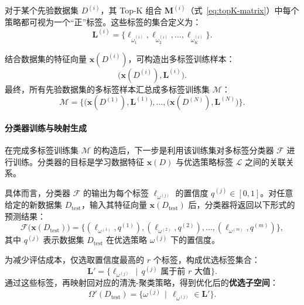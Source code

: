 \documentclass[8pt]{article} %
\numberwithin{equation}{section}
\begin{document}
对于某个先验数据集 $D^{(i)}$，其 Top-K 组合 $\mathbf{M}^{(i)}$（式~\eqref{eq:topK-matrix}）中每个策略都可视为一个“正”标签。这些标签的集合定义为：
\begin{equation}\label{eq:label-space-for-D}
\mathbf{L}^{(i)}
= \{\ell_{\omega_1^{(i)}}, \ell_{\omega_2^{(i)}}, \ldots, \ell_{\omega_K^{(i)}}\}.
\end{equation}

结合数据集的特征向量 $\mathbf{x}(D^{(i)})$，可构造出多标签训练样本：
\[
\bigl(\mathbf{x}(D^{(i)}), \mathbf{L}^{(i)}\bigr).
\]
最终，所有先验数据集的多标签样本汇总成多标签训练集 $\mathcal{M}$：
\begin{equation}\label{eq:training-set}
\mathcal{M}
= \bigl\{\bigl(\mathbf{x}(D^{(1)}), \mathbf{L}^{(1)}\bigr), \ldots, \bigl(\mathbf{x}(D^{(N)}), \mathbf{L}^{(N)}\bigr)\bigr\}.
\end{equation}

\paragraph{分类器训练与映射生成}  
在完成多标签训练集 $\mathcal{M}$ 的构造后，下一步是利用该训练集对多标签分类器 $\mathcal{F}$ 进行训练。分类器的目标是学习数据特征 $\mathbf{x}(D)$ 与优选策略标签 $\mathcal{L}$ 之间的关联关系。

具体而言，分类器 $\mathcal{F}$ 的输出为每个标签 $\ell_{\omega^{(j)}}$ 的置信度 $q^{(j)} \in [0,1]$。对任意给定的新数据集 $D_{\text{test}}$，输入其特征向量 $\mathbf{x}(D_{\text{test}})$ 后，分类器将返回以下形式的预测结果：
\begin{equation}\label{eq:classifier}
\mathcal{F}\bigl(\mathbf{x}(D_{\text{test}})\bigr)
= \bigl\{(\ell_{\omega^{(1)}}, q^{(1)}), (\ell_{\omega^{(2)}}, q^{(2)}), \ldots, (\ell_{\omega^{(m)}}, q^{(m)})\bigr\},
\end{equation}
其中 $q^{(j)}$ 表示数据集 $D_{\text{test}}$ 在优选策略 $\omega^{(j)}$ 下的置信度。

为减少评估成本，仅选取置信度最高的 $r$ 个标签，构成优选标签集合：
\begin{equation}\label{eq:predicted-label-space}
\mathbf{L}' = \bigl\{\ell_{\omega^{(j)}} \,\mid\, q^{(j)} \text{ 属于前 } r \text{ 大值}\bigr\}.
\end{equation}
通过这些标签，再映射回对应的清洗-聚类策略，得到优化后的\textbf{优选子空间}：
\begin{equation}\label{eq:optimized-space}
\Omega'(D_{\text{test}})
= \bigl\{\omega^{(j)} \,\mid\, \ell_{\omega^{(j)}} \in \mathbf{L}'\bigr\}.
\end{equation}
\end{document}
